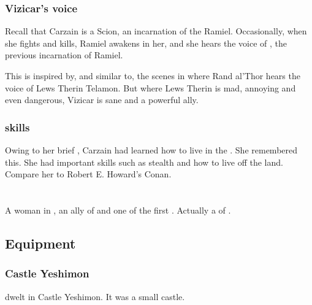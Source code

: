 \subsubsection{Vizicar's voice}
Recall that Carzain is a Scion, an incarnation of the \Malach{} Ramiel. 
Occasionally, when she fights and kills, Ramiel awakens in her, and she hears the voice of , the previous incarnation of Ramiel. 

This is inspired by, and similar to, the scenes in  where Rand al'Thor hears the voice of Lews Therin Telamon. But where Lews Therin is mad, annoying and even dangerous, Vizicar is sane and a powerful ally. 





\subsubsection{\Wylde skills}
Owing to her brief , Carzain had learned how to live in the \wylde. 
She remembered this. 
She had important skills such as stealth and how to live off the land. 
Compare her to Robert E. Howard's Conan.















\section{\Delphine}
\index{\Delphine}
A \human{} woman in , an ally of  and one of the first . 
Actually a  of . 









\subsection{Equipment}





\subsubsection{Castle Yeshimon}
\Delphine dwelt in Castle Yeshimon. 
It was a small castle. 









